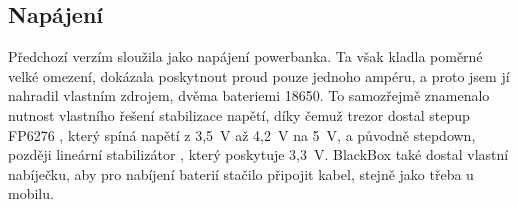 \vspace{-4mm}

\subsection{Napájení}
Předchozí verzím sloužila jako napájení powerbanka. Ta však kladla poměrné velké omezení, dokázala poskytnout proud pouze jednoho ampéru, a proto 
jsem jí nahradil vlastním zdrojem, dvěma bateriemi 18650. 
To samozřejmě znamenalo nutnost vlastního řešení stabilizace napětí, díky čemuž trezor dostal stepup FP6276 \parencite{fp6276a} , 
který spíná napětí z 3,5~V až 4,2~V na 5~V, a původně stepdown, později lineární stabilizátor , který poskytuje 3,3~V. 
BlackBox také dostal vlastní nabíječku, aby pro nabíjení baterií stačilo připojit kabel, stejně jako třeba u mobilu.